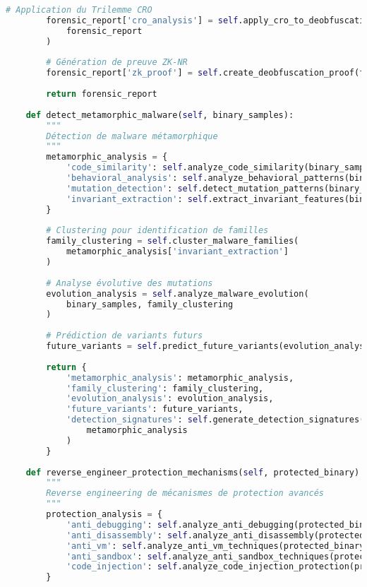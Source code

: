 \begin{lstlisting}[language=Python, caption=Système de détection et déobfuscation avancé]
        # Application du Trilemme CRO
        forensic_report['cro_analysis'] = self.apply_cro_to_deobfuscation(
            forensic_report
        )
        
        # Génération de preuve ZK-NR
        forensic_report['zk_proof'] = self.create_deobfuscation_proof(forensic_report)
        
        return forensic_report
    
    def detect_metamorphic_malware(self, binary_samples):
        """
        Détection de malware métamorphique
        """
        metamorphic_analysis = {
            'code_similarity': self.analyze_code_similarity(binary_samples),
            'behavioral_analysis': self.analyze_behavioral_patterns(binary_samples),
            'mutation_detection': self.detect_mutation_patterns(binary_samples),
            'invariant_extraction': self.extract_invariant_features(binary_samples)
        }
        
        # Clustering pour identification de familles
        family_clustering = self.cluster_malware_families(
            metamorphic_analysis['invariant_extraction']
        )
        
        # Analyse évolutive des mutations
        evolution_analysis = self.analyze_malware_evolution(
            binary_samples, family_clustering
        )
        
        # Prédiction de variants futurs
        future_variants = self.predict_future_variants(evolution_analysis)
        
        return {
            'metamorphic_analysis': metamorphic_analysis,
            'family_clustering': family_clustering,
            'evolution_analysis': evolution_analysis,
            'future_variants': future_variants,
            'detection_signatures': self.generate_detection_signatures(
                metamorphic_analysis
            )
        }
    
    def reverse_engineer_protection_mechanisms(self, protected_binary):
        """
        Reverse engineering de mécanismes de protection avancés
        """
        protection_analysis = {
            'anti_debugging': self.analyze_anti_debugging(protected_binary),
            'anti_disassembly': self.analyze_anti_disassembly(protected_binary),
            'anti_vm': self.analyze_anti_vm_techniques(protected_binary),
            'anti_sandbox': self.analyze_anti_sandbox_techniques(protected_binary),
            'code_injection': self.analyze_code_injection_protection(protected_binary)
        }
        

\end{lstlisting}
